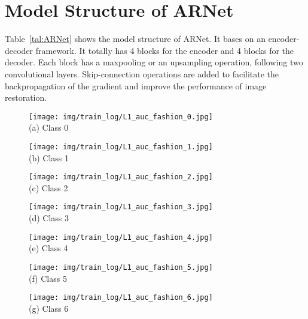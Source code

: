 \documentclass[journal]{IEEEtran}
\begin{document}
\section{Model Structure of ARNet}
Table~\ref{tal:ARNet} shows the model structure of ARNet. It bases on an encoder-decoder framework. It totally has 4 blocks for the encoder and 4 blocks for the decoder. Each block has a maxpooling or an upsampling operation, following two  convolutional layers. Skip-connection operations are added to facilitate the backpropagation of the gradient and improve the performance of image restoration. 


\begin{figure}[htbp]
\centering
\begin{minipage}[t]{0.24\textwidth}
\centering
\texttt{[image: img/train\_log/L1\_auc\_fashion\_0.jpg]}\\
(a) Class 0
\end{minipage}
\begin{minipage}[t]{0.24\textwidth}
\centering
\texttt{[image: img/train\_log/L1\_auc\_fashion\_1.jpg]}\\
(b) Class 1
\end{minipage}
\begin{minipage}[t]{0.24\textwidth}
\centering
\texttt{[image: img/train\_log/L1\_auc\_fashion\_2.jpg]}\\
(c) Class 2
\end{minipage}
\begin{minipage}[t]{0.24\textwidth}
\centering
\texttt{[image: img/train\_log/L1\_auc\_fashion\_3.jpg]}\\
(d) Class 3
\end{minipage}
\begin{minipage}[t]{0.24\textwidth}
\centering
\texttt{[image: img/train\_log/L1\_auc\_fashion\_4.jpg]}\\
(e) Class 4
\end{minipage}
\begin{minipage}[t]{0.24\textwidth}
\centering
\texttt{[image: img/train\_log/L1\_auc\_fashion\_5.jpg]}\\
(f) Class 5
\end{minipage}
\begin{minipage}[t]{0.24\textwidth}
\centering
\texttt{[image: img/train\_log/L1\_auc\_fashion\_6.jpg]}\\
(g) Class 6
\end{minipage}
\begin{minipage}[t]{0.24\textwidth}

\end{minipage}
\end{figure}
\end{document}
